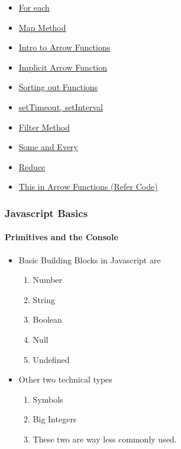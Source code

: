 \documentclass[
  paper=a4,
  ,captions=tableheading
]{scrartcl}
\providecommand{\tightlist}{%
  \setlength{\itemsep}{0pt}\setlength{\parskip}{0pt}}
\begin{document}
\begin{itemize}
  \begin{itemize}
  \tightlist
  \item
    \protect\hyperlink{for-each}{For each}
  \item
    \protect\hyperlink{map-method}{Map Method}
  \item
    \protect\hyperlink{intro-to-arrow-functions}{Intro to Arrow
    Functions}
  \item
    \protect\hyperlink{implicit-arrow-function}{Implicit Arrow Function}
  \item
    \protect\hyperlink{sorting-out-functions}{Sorting out Functions}
  \item
    \protect\hyperlink{settimeout-setinterval}{setTimeout, setInterval}
  \item
    \protect\hyperlink{filter-method}{Filter Method}
  \item
    \protect\hyperlink{some-and-every}{Some and Every}
  \item
    \protect\hyperlink{reduce}{Reduce}
  \item
    \protect\hyperlink{this-in-arrow-functions-refer-code}{This in Arrow
    Functions (Refer Code)}
  \end{itemize}
\end{itemize}

\hypertarget{javascript-basics}{%
\subsubsection{Javascript Basics}\label{javascript-basics}}

\hypertarget{primitives-and-the-console}{%
\paragraph{Primitives and the
Console}\label{primitives-and-the-console}}

\begin{itemize}
\tightlist
\item
  Basic Building Blocks in Javascript are

  \begin{enumerate}
  \def\labelenumi{\arabic{enumi}.}
  \tightlist
  \item
    Number
  \item
    String
  \item
    Boolean
  \item
    Null
  \item
    Undefined
  \end{enumerate}
\item
  Other two technical types

  \begin{enumerate}
  \def\labelenumi{\arabic{enumi}.}
  \tightlist
  \item
    Symbols
  \item
    Big Integers
  \item
    These two are way less commonly used.
  \end{enumerate}
\end{itemize}
\end{document}
